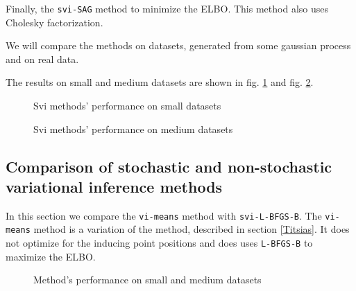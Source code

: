 \documentclass[12pt]{article}
\begin{document}
		Finally, the \lstinline{svi-SAG} method to minimize the ELBO. This method also uses Cholesky factorization.

		We will compare the methods on datasets, generated from some gaussian process and on real data. 


		The results on small and medium datasets are shown in fig. \ref{svi_small} and fig. \ref{svi_medium}.

		\begin{figure}[h!]
			\centering

			\subfloat{
				\scalebox{0.75}{
					
				}
			}
			\subfloat{
				\scalebox{0.75}{
		    		
				}
			}
			\vspace{0.1cm}
			\caption{Svi methods' performance on small datasets}
			\label{svi_small}
		\end{figure}


		\begin{figure}[h!]
			\centering
			\subfloat{
				\scalebox{0.75}{
					
				}
			}
			\subfloat{
				\scalebox{0.75}{
		    		
				}
			}
			\label{svi_medium}
			\caption{Svi methods' performance on medium datasets}
		\end{figure}

\subsection{Comparison of stochastic and non-stochastic variational inference methods}
	In this section we compare the \lstinline{vi-means} method with \lstinline{svi-L-BFGS-B}. The \lstinline{vi-means} method is a variation of the method, described in section \ref{Titsias}. It does not optimize for the inducing point positions and does uses \lstinline{L-BFGS-B} to maximize the ELBO.

	\begin{figure}[!h]
		\centering
		\subfloat{
			\scalebox{0.75}{
				
			}
		}
		\subfloat{
			\scalebox{0.75}{
	    		
			}
		}
		
		\caption{Method's performance on small and medium datasets}
	\end{figure}
\end{document}

